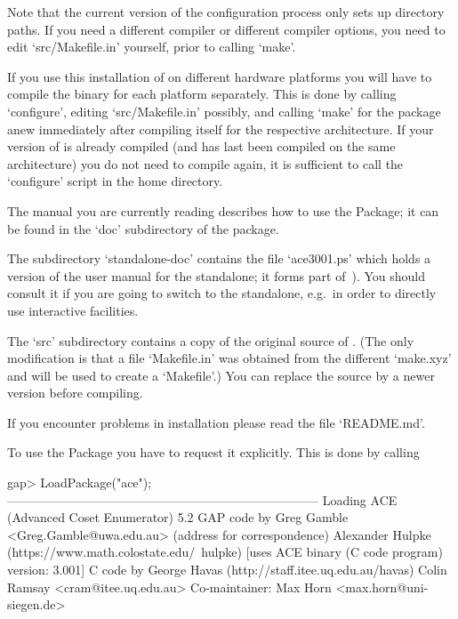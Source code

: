 Note that the  current version of the configuration  process only sets
up  directory paths.  If you  need a  different compiler  or different
compiler options, you need to edit `src/Makefile.in'  yourself,  prior
to calling `make'.

If you use this installation of {\GAP} on different hardware platforms
you will have to compile the binary for each platform separately. This
is done by calling `configure',  editing  `src/Makefile.in'  possibly,
and calling `make' for the package anew  immediately  after  compiling
{\GAP} itself for the respective  architecture.  If  your  version  of
{\GAP} is already compiled (and has last been  compiled  on  the  same
architecture)  you  do  not  need  to  compile  {\GAP}  again,  it  is
sufficient  to  call  the  `configure'  script  in  the  {\GAP}   home
directory.

The manual you are currently reading describes how to use  the  {\ACE}
Package; it can be found in the `doc' subdirectory of the package. %
%
%

The subdirectory `standalone-doc' contains the file `ace3001.ps' which
holds a version of the user manual for the {\ACE} standalone; it forms
part of~\cite{Ram99ace}). You should consult  it  if  you  are  going  to
switch to  the  {\ACE}  standalone,  e.g.~in  order  to  directly  use
interactive facilities.

The  `src' subdirectory  contains a  copy  of the  original source  of
{\ACE}.  (The  only modification  is  that  a  file `Makefile.in'  was
obtained from  the different `make.xyz' and  will be used  to create a
`Makefile'.)  You  can replace  the source by  a newer  version before
compiling.

If you encounter problems in installation please read the file `README.md'.


To use the {\ACE} Package you have  to  request  it  explicitly.
This is done by calling

\beginexample
gap> LoadPackage("ace");
---------------------------------------------------------------------------
Loading    ACE (Advanced Coset Enumerator) 5.2
GAP code by Greg Gamble <Greg.Gamble@uwa.edu.au> (address for correspondence)
       Alexander Hulpke (https://www.math.colostate.edu/~hulpke)
           [uses ACE binary (C code program) version: 3.001]
C code by  George Havas (http://staff.itee.uq.edu.au/havas)
           Colin Ramsay <cram@itee.uq.edu.au>
Co-maintainer: Max Horn <max.horn@uni-siegen.de>

